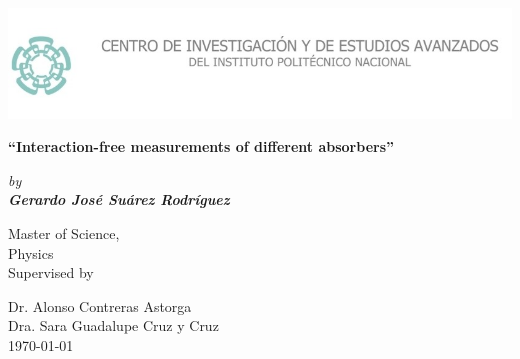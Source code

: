 \documentclass[12pt]{book}
\begin{document}
\newcommand\numberthis{\addtocounter{equation}{1}\tag{\theequation}}

\raggedbottom


\thispagestyle{empty}
\setlength\headheight{0pt} 
\begin{center}

\begin{center}
\includegraphics[width=1\linewidth]{images/logo.jpg}            
\end{center}    

  \vspace{3 cm}

        {\Large\bfseries  ``Interaction-free measurements of different absorbers''\par}

        \vspace{0.5cm}
        {\Large\itshape by \\ \bfseries Gerardo José Suárez Rodríguez \par \par}
        

\vspace{2cm}


Master of Science, \\ Physics\\
Supervised by\par
Dr. Alonso Contreras Astorga  \\
Dra. Sara Guadalupe Cruz y Cruz\\


\vspace{1cm}
\large
\today

\end{center}

\clearpage

\tableofcontents
{}
\pagebreak
{}
\end{document}
